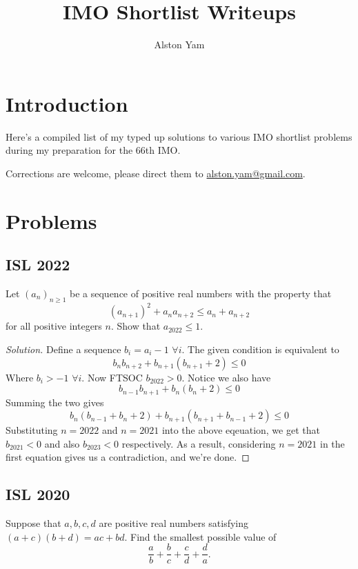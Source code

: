 \documentclass{article}
\date{}
\title{IMO Shortlist Writeups}
\author{Alston Yam}
\theoremstyle{mytheoremstyle}
\theoremstyle{mytheoremstyle}
\theoremstyle{myproblemstyle}
\begin{document}
    \maketitle
    \section{Introduction}
    Here's a compiled list of my typed up solutions to various IMO shortlist problems during my preparation for the 66th IMO. 

    Corrections are welcome, please direct them to \url{alston.yam@gmail.com}.
    
    \section{Problems}
    \subsection{ISL 2022}

    \begin{problem}[2022 A1]
        Let $(a_n)_{n\geq 1}$ be a sequence of positive real numbers with the property that
            \[ (a_{n+1})^2 + a_na_{n+2} \leq a_n + a_{n+2} \]
        for all positive integers $n$. Show that $a_{2022}\leq 1$.
    \end{problem}

    \begin{proof}[Solution]
        Define a sequence $b_i = a_i - 1$ $\forall i$. The given condition is equivalent to \[b_nb_{n+2} + b_{n+1}(b_{n+1} + 2) \leq 0\]
        Where $b_i > -1$ $\forall i$. Now FTSOC $b_{2022} > 0$. Notice we also have \[b_{n-1}b_{n+1} + b_{n}(b_{n} + 2) \leq 0\]
        Summing the two gives
        \[b_n(b_{n-1} + b_n + 2) + b_{n+1}(b_{n+1} + b_{n-1} + 2)\leq 0\]
        Substituting $n=2022$ and $n=2021$ into the above eqeuation, we get that $b_{2021} < 0$ and also $b_{2023} < 0$ respectively. As a result, considering $n=2021$ in the first equation gives us a contradiction, and we're done.
    \end{proof}

    \pagebreak

    \subsection{ISL 2020}

    \begin{problem}[2020 A3]
        Suppose that $a,b,c,d$ are positive real numbers satisfying $(a+c)(b+d)=ac+bd$. Find the smallest possible value of
        \[ \frac{a}{b}+\frac{b}{c}+\frac{c}{d}+\frac{d}{a}. \]
    \end{problem}
\end{document}
